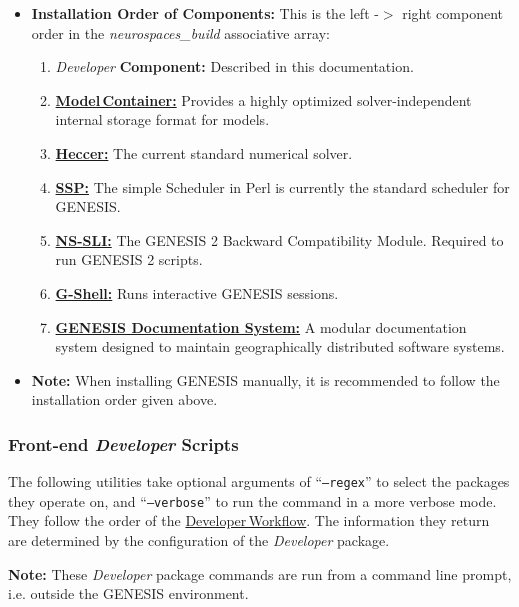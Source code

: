 \documentclass[12pt]{article}
\begin{document}
\begin{itemize}
   \item {\bf Installation Order of Components:} This is the left -$>$ right component order in the {\it neurospaces\_build} associative array:
   \begin{enumerate}
      \item {\it Developer} {\bf Component:} Described in this documentation.
      \item \href{../model-container/model-container.tex}{\bf Model\,Container:} Provides a highly optimized solver-independent internal storage format for models.
      \item \href{../heccer/heccer.tex}{\bf Heccer:} The current standard numerical solver.
      \item \href{../ssp/ssp.tex}{\bf SSP:} The simple Scheduler in Perl is currently the standard scheduler for GENESIS.
      \item \href{../nssli/nssli.tex}{\bf NS-SLI:} The GENESIS 2 Backward Compatibility Module. Required to run GENESIS 2 scripts.
      \item \href{../gshell/gshell.tex}{\bf G-Shell:} Runs interactive GENESIS sessions.
      \item \href{../documentation-overview/documentation-overview.tex}{\bf GENESIS Documentation System:} A modular documentation system designed to maintain geographically distributed software systems.
   \end{enumerate}
   \item {\bf Note:} When installing GENESIS manually, it is recommended to follow the installation order given above. 
\end{itemize}


\subsubsection*{Front-end {\it Developer} Scripts}

The following utilities take optional arguments of ``{\tt --regex}'' to select the packages they operate on, and ``{\tt --verbose}'' to run the command in a more verbose mode. They follow the order of the \href{../workflow-developer/workflow-developer.tex}{Developer\,Workflow}. The information they return are determined by the configuration of the {\it Developer} package.

{\bf Note:} These {\it Developer} package commands are run from a command line prompt, i.e. outside the GENESIS environment.
\end{document}
